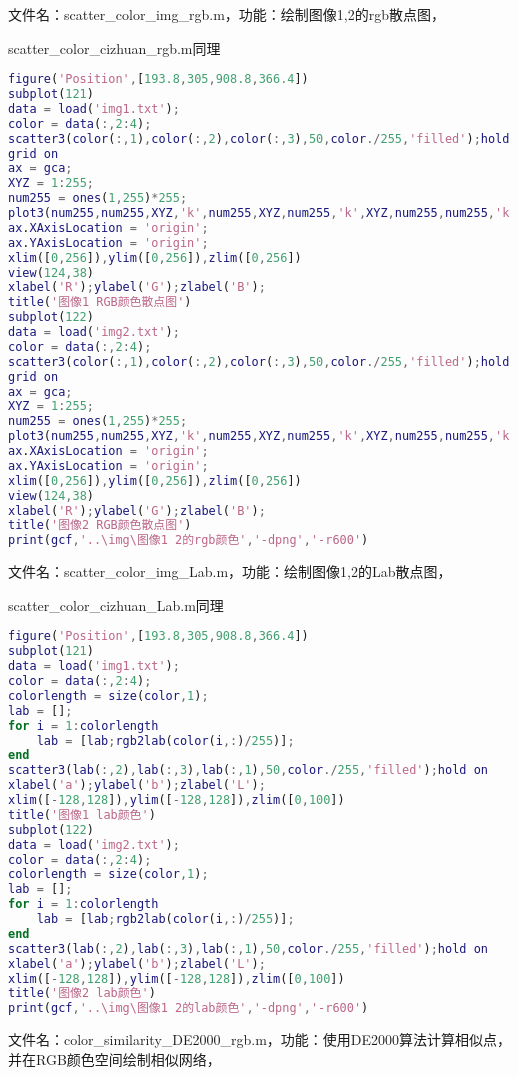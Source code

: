 文件名：scatter\_color\_img\_rgb.m，功能：绘制图像1,2的rgb散点图，

scatter\_color\_cizhuan\_rgb.m同理
\begin{lstlisting}[language=matlab]
figure('Position',[193.8,305,908.8,366.4])
subplot(121)
data = load('img1.txt');
color = data(:,2:4);
scatter3(color(:,1),color(:,2),color(:,3),50,color./255,'filled');hold on 
grid on
ax = gca;
XYZ = 1:255;
num255 = ones(1,255)*255;
plot3(num255,num255,XYZ,'k',num255,XYZ,num255,'k',XYZ,num255,num255,'k');
ax.XAxisLocation = 'origin';
ax.YAxisLocation = 'origin';
xlim([0,256]),ylim([0,256]),zlim([0,256])
view(124,38)
xlabel('R');ylabel('G');zlabel('B');
title('图像1 RGB颜色散点图')
subplot(122)
data = load('img2.txt');
color = data(:,2:4);
scatter3(color(:,1),color(:,2),color(:,3),50,color./255,'filled');hold on 
grid on
ax = gca;
XYZ = 1:255;
num255 = ones(1,255)*255;
plot3(num255,num255,XYZ,'k',num255,XYZ,num255,'k',XYZ,num255,num255,'k');
ax.XAxisLocation = 'origin';
ax.YAxisLocation = 'origin';
xlim([0,256]),ylim([0,256]),zlim([0,256])
view(124,38)
xlabel('R');ylabel('G');zlabel('B');
title('图像2 RGB颜色散点图')
print(gcf,'..\img\图像1 2的rgb颜色','-dpng','-r600')
\end{lstlisting}	
文件名：scatter\_color\_img\_Lab.m，功能：绘制图像1,2的Lab散点图，

scatter\_color\_cizhuan\_Lab.m同理
\begin{lstlisting}[language=matlab]
figure('Position',[193.8,305,908.8,366.4])
subplot(121)
data = load('img1.txt');
color = data(:,2:4);
colorlength = size(color,1);
lab = [];
for i = 1:colorlength
	lab = [lab;rgb2lab(color(i,:)/255)];
end
scatter3(lab(:,2),lab(:,3),lab(:,1),50,color./255,'filled');hold on 
xlabel('a');ylabel('b');zlabel('L');
xlim([-128,128]),ylim([-128,128]),zlim([0,100])
title('图像1 lab颜色')
subplot(122)
data = load('img2.txt');
color = data(:,2:4);
colorlength = size(color,1);
lab = [];
for i = 1:colorlength
	lab = [lab;rgb2lab(color(i,:)/255)];
end
scatter3(lab(:,2),lab(:,3),lab(:,1),50,color./255,'filled');hold on 
xlabel('a');ylabel('b');zlabel('L');
xlim([-128,128]),ylim([-128,128]),zlim([0,100])
title('图像2 lab颜色')
print(gcf,'..\img\图像1 2的lab颜色','-dpng','-r600')
\end{lstlisting}




文件名：color\_similarity\_DE2000\_rgb.m，功能：使用DE2000算法计算相似点，并在RGB颜色空间绘制相似网络，

